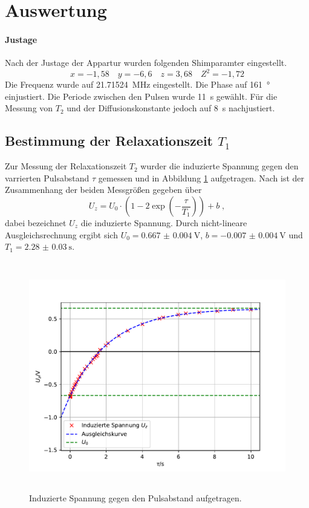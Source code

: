 \section{Auswertung}
\label{sec:Auswertung}
\paragraph{Justage} 
Nach der Justage der Appartur wurden folgenden Shimparamter eingestellt.
\begin{equation*}
x = -1,58 \quad y = -6,6 \quad z = 3,68 \quad Z^2 = -1,72	
\end{equation*}
Die Frequenz wurde auf \SI{21,71524}{\mega\Hz} eingestellt. Die Phase auf 
\SI{161}{\degree} einjustiert. Die Periode zwischen den Pulsen wurde 
\SI{11}{\second} gewählt. Für die Messung von $T_2$ und der Diffusionskonstante 
jedoch auf \SI{8}{\second} nachjustiert.

\subsection{Bestimmung der Relaxationszeit \texorpdfstring{$T_1$}{math}}
Zur Messung der Relaxationszeit $T_2$ wurder die induzierte Spannung gegen den varrierten 
Pulsabstand $\tau$ gemessen und in Abbildung \ref{fig:T1} aufgetragen. Nach \cite{Anleitung} 
ist der Zusammenhang der beiden Messgrößen gegeben über 
\begin{equation}
U_z = U_0 \cdot \left( 1-2\exp \left( -\frac{\tau}{T_1} \right) \right) + b	\; ,
\end{equation}
dabei bezeichnet $U_z$ die induzierte Spannung. Durch nicht-lineare Ausgleichsrechnung 
ergibt sich $U_0 = \SI{0.667(4)}{\volt}$, $b = \SI{-0.007(4)}{\volt}$ und $T_1 = \SI{2.28(3)}{\second}$. 
\begin{figure}
  \centering
  \includegraphics[height = 10cm]{plots/T1plot.pdf}
  \caption{Induzierte Spannung gegen den Pulsabstand aufgetragen.}
  \label{fig:T1}
\end{figure}

